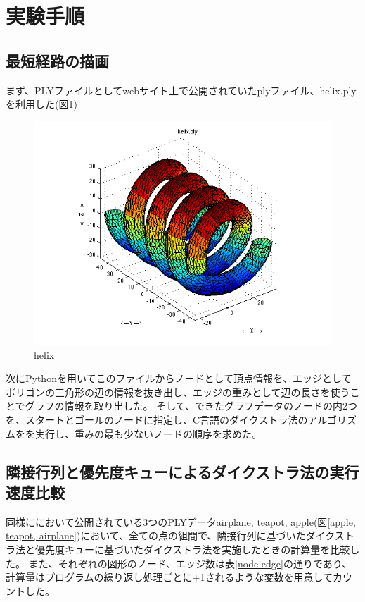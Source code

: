 \documentclass[a4paper,11pt]{jsarticle}
\begin{document}
\section{実験手順}

\subsection{最短経路の描画}

まず、PLYファイルとしてwebサイト上で公開されていたplyファイル、helix.plyを利用した(図\ref{helix})

\begin{figure}[H]
  \centering
  \includegraphics[scale = 0.5]{../Figs/helix.png} 
  \caption{helix}
  \label{helix}
\end{figure}

次にPythonを用いてこのファイルからノードとして頂点情報を、エッジとしてポリゴンの三角形の辺の情報を抜き出し、エッジの重みとして辺の長さを使うことでグラフの情報を取り出した。
そして、できたグラフデータのノードの内2つを、スタートとゴールのノードに指定し、C言語のダイクストラ法のアルゴリズムをを実行し、重みの最も少ないノードの順序を求めた。

\subsection{隣接行列と優先度キューによるダイクストラ法の実行速度比較}

同様に\cite{fsu}において公開されている3つのPLYデータairplane, teapot, apple(図\ref{apple, teapot, airplane})において、全ての点の組間で、隣接行列に基づいたダイクストラ法と優先度キューに基づいたダイクストラ法を実施したときの計算量を比較した。
また、それぞれの図形のノード、エッジ数は表\ref{node-edge}の通りであり、計算量はプログラムの繰り返し処理ごとに+1されるような変数を用意してカウントした。
\end{document}
